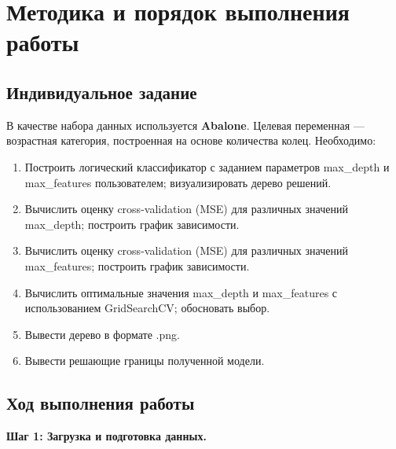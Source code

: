 \section{Методика и порядок выполнения работы}

\subsection{Индивидуальное задание}

В качестве набора данных используется \textbf{Abalone}. Целевая переменная — возрастная категория, построенная на основе количества колец. Необходимо:

\begin{enumerate}
    \item Построить логический классификатор с заданием параметров max\_depth и max\_features пользователем; визуализировать дерево решений.
    \item Вычислить оценку cross-validation (MSE) для различных значений max\_depth; построить график зависимости.
    \item Вычислить оценку cross-validation (MSE) для различных значений max\_features; построить график зависимости.
    \item Вычислить оптимальные значения max\_depth и max\_features с использованием GridSearchCV; обосновать выбор.
    \item Вывести дерево в формате .png.
    \item Вывести решающие границы полученной модели.
\end{enumerate}

\subsection{Ход выполнения работы}

\textbf{Шаг 1: Загрузка и подготовка данных.}

